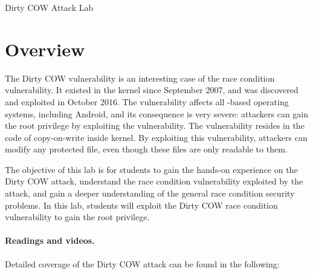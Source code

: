 
\newcommand{\commonfolder}{../../common-files}





\newcommand{\cowFigs}{./Figs}





\begin{center}
{\LARGE Dirty COW Attack Lab}
\end{center}




\section{Overview}

The Dirty COW vulnerability is an interesting case of
the race condition vulnerability. It existed in the \linux kernel since
September 2007, and was discovered and exploited in October 2016.
The vulnerability affects all \linux-based operating systems, including
Android, and its consequence is very severe: attackers can gain the root
privilege by exploiting the vulnerability. The vulnerability resides
in the code of copy-on-write inside \linux kernel. By exploiting this vulnerability, attackers
can modify any protected file, even though these files are only readable to them.

The objective of this lab is for students to gain the hands-on experience on the Dirty COW
attack, understand the race condition vulnerability exploited by the attack, and 
gain a deeper understanding of the general race condition security problems. In this lab,
students will exploit the Dirty COW race condition vulnerability to gain the root privilege.  


\paragraph{Readings and videos.}
Detailed coverage of the Dirty COW attack can be found in the following:

